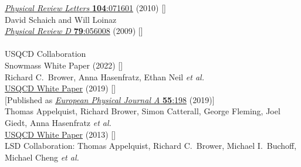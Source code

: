 \begin{spacelist}
\begin{revnumerate}
      \href{https://doi.org/10.1103/PhysRevLett.104.071601}{\textit{Physical Review Letters} \textbf{104}:071601} (2010) []
    \pagebreakitem
       \\
      David Schaich and Will Loinaz \\
      \href{https://doi.org/10.1103/PhysRevD.79.056008}{\textit{Physical Review D} \textbf{79}:056008} (2009) [] \\
%
%
%
\vspace{18 pt} \hspace{-22 pt}{\large \bfseries Other articles, theses \& white papers} \vspace{-8 pt}
    \pagebreakitem
       \\
      USQCD Collaboration \\
      Snowmass White Paper (2022) []
    \pagebreakitem
       \\
      Richard C.~Brower, Anna Hasenfratz, Ethan Neil \textit{et al.} \\ %
      \href{http://home.fnal.gov/~ask/USQCD/members/WP/BSMwhitepaper2018.pdf}{USQCD White Paper} (2019) [] \\
      {[Published as \href{http://doi.org/10.1140/epja/i2019-12901-5}{\textit{European Physical Journal A} \textbf{55}:198} (2019)]}
    \pagebreakitem
       \\
      Thomas Appelquist, Richard Brower, Simon Catterall, George Fleming, Joel Giedt, Anna Hasenfratz \textit{et al.} \\ %
      \href{http://www.usqcd.org/documents/13BSM.pdf}{USQCD White Paper} (2013) []
    \pagebreakitem
       \\
      LSD Collaboration: Thomas Appelquist, Richard C.~Brower, Michael I.~Buchoff, Michael Cheng \textit{et al.} \\ %

\end{revnumerate}
\end{spacelist}
